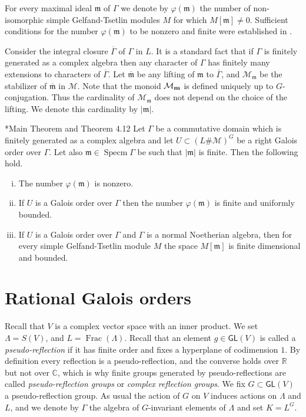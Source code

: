 \documentclass[11pt,fleqn]{amsart}
\newcommand\CC{\mathbb C}
\newcommand\RR{\mathbb R}
\newcommand\m{\mathfrak m}
\DeclareMathOperator\Frac{Frac}
\DeclareMathOperator\Specm{Specm}
\begin{document}
For every maximal ideal $\m$ of $\Gamma$ we denote by $\varphi(\m)$ the number 
of non-isomorphic simple Gelfand-Tsetlin modules $M$ for which $M[\m] \neq 0$. 
Sufficient conditions for the number $\varphi(\m)$ to be nonzero and finite 
were established in \cite{FO-fibers-gt}. 

Consider the integral closure $\overline{\Gamma}$ of $\Gamma$ in $L$. It is a 
standard fact that if $\Gamma$ is finitely generated as a complex algebra then 
any character of $\Gamma$ has finitely many extensions to characters of 
$\overline{\Gamma}$. Let $\overline{\m}$ be any lifting of $\m$ to 
$\overline{\Gamma}$, and $\mathcal M_{\m}$ be the stabilizer of $\overline{\m}$
in $\mathcal M$. Note that the monoid $\mathcal M_{\bf m}$ is defined uniquely 
up to $G$-conjugation. Thus the cardinality of $\mathcal M_{\m}$ does not 
depend on the choice of the lifting. We denote this cardinality by $|\m|$.





\begin{Theorem}{\cite{FO-fibers-gt}*{Main Theorem and Theorem 4.12}}
\label{T:theorem-extension}
Let $\Gamma$ be a commutative domain which is finitely generated as a complex 
algebra and let $U\subset (L\# \mathcal M)^{G}$ be a right Galois order 
over $\Gamma$. Let also $\m \in \Specm \Gamma$ be such that $|\m|$ is finite. 
Then the following hold.
\begin{enumerate}[(i)]
\item
\label{fiber-nontrivial} 
The number $\varphi(\m)$ is nonzero.

\item
\label{fiber-finite} 
If $U$ is a Galois order over $\Gamma$ then the number $\varphi(\m)$ is finite 
and uniformly bounded.

\item
If $U$ is a Galois order over $\Gamma$ and $\Gamma$ is a normal Noetherian 
algebra, then for every simple Gelfand-Tsetlin module $M$ the space 
$M[\m]$ is finite dimensional and bounded.
\end{enumerate}
\end{Theorem}

\section{Rational Galois orders}
Recall that $V$ is a complex vector space with an inner product. We set 
$\Lambda = S(V)$, and $L = \Frac(\Lambda)$. Recall that an element $g \in 
\mathsf{GL}(V)$ is called a \emph{pseudo-reflection} if it has finite order 
and fixes a hyperplane of codimension $1$. By definition every reflection is a 
pseudo-reflection, and the converse holds over $\RR$ but not over $\CC$, which 
is why finite groups generated by pseudo-reflections are called 
\emph{pseudo-reflection groups} or \emph{complex reflection groups}. We fix 
$G \subset \mathsf{GL}(V)$ a pseudo-reflection group. As usual the 
action of $G$ on $V$ induces actions on $\Lambda$ and $L$, and we denote by 
$\Gamma$ the algebra of $G$-invariant elements of $\Lambda$ and set $K = L^G$.
\end{document}
